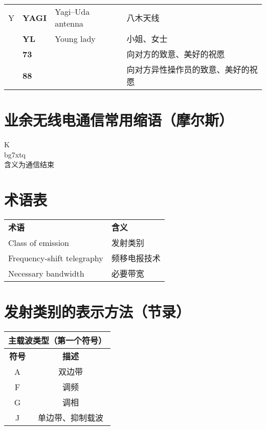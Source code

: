 \begin{longtable}[l]{llll}
  Y & \textbf{YAGI}                     & Yagi–Uda antenna                        & 八木天线                \\
    & \textbf{YL}                       & Young lady                              & 小姐、女士               \\
    & \textbf{73}                       &                                         & 向对方的致意、美好的祝愿        \\
    & \textbf{88}                       &                                         & 向对方异性操作员的致意、美好的祝愿   \\
\end{longtable}

\newpage

\section{业余无线电通信常用缩语（摩尔斯）}

\noindent K \\

{ \morse bg7xtq } \\

含义为通信结束\\

\newpage

\section{术语表}

\begin{longtable}[l]{ll}
  \textbf{术语}                & \textbf{含义} \\
  Class of emission          & 发射类别        \\
  Frequency-shift telegraphy & 频移电报技术      \\
  Necessary bandwidth        & 必要带宽        \\
\end{longtable}

\newpage

\section{发射类别的表示方法（节录）}

\begin{tabular}{|c|c|}
  \hline
  \multicolumn{2}{|c|}{\textbf{主载波类型（第一个符号）}} \\
  \hline
  \textbf{符号} & \textbf{描述}                   \\
  \hline
  A           & 双边带                           \\
  \hline
  F           & 调频                            \\
  \hline
  G           & 调相                            \\
  \hline
  J           & 单边带、抑制载波                      \\
  \hline
\end{tabular}

